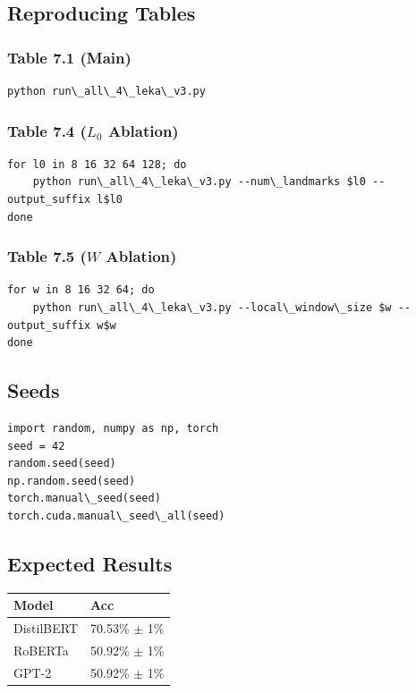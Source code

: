 \subsection{Reproducing Tables}

\subsubsection{Table 7.1 (Main)}
\begin{lstlisting}
python run\_all\_4\_leka\_v3.py
\end{lstlisting}

\subsubsection{Table 7.4 ($L_0$ Ablation)}
\begin{lstlisting}
for l0 in 8 16 32 64 128; do
    python run\_all\_4\_leka\_v3.py --num\_landmarks $l0 --output_suffix l$l0
done
\end{lstlisting}

\subsubsection{Table 7.5 ($W$ Ablation)}
\begin{lstlisting}
for w in 8 16 32 64; do
    python run\_all\_4\_leka\_v3.py --local\_window\_size $w --output_suffix w$w
done
\end{lstlisting}

\subsection{Seeds}

\begin{lstlisting}
import random, numpy as np, torch
seed = 42
random.seed(seed)
np.random.seed(seed)
torch.manual\_seed(seed)
torch.cuda.manual\_seed\_all(seed)
\end{lstlisting}

\subsection{Expected Results}

\begin{table}[H]
\centering
\small
\begin{tabular}{ll}
\toprule
\textbf{Model} & \textbf{Acc} \\
\midrule
DistilBERT & 70.53\% $\pm$ 1\% \\
RoBERTa & 50.92\% $\pm$ 1\% \\
GPT-2 & 50.92\% $\pm$ 1\% \\
\bottomrule
\end{tabular}
\end{table}

